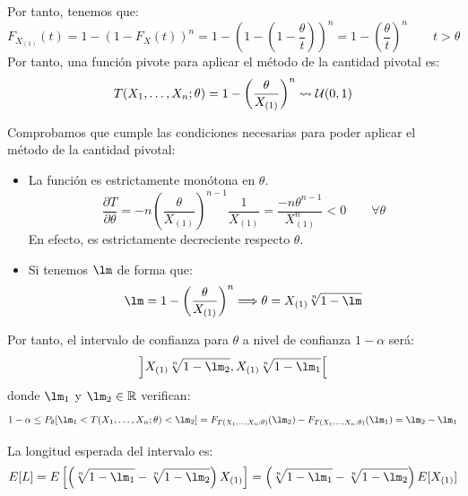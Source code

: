 \begin{ejercicio}
    Por tanto, tenemos que:
    \begin{equation*}
        F_{X_{(1)}}(t) = 1-{(1-F_X(t))}^{n} = 1 - {\left(1-\left(1-\frac{\theta}{t}\right)\right)}^{n} = 1-{\left(\frac{\theta}{t}\right)}^{n} \qquad t> \theta
    \end{equation*}
    Por tanto, una función pivote para aplicar el método de la cantidad pivotal es:
    \begin{equation*}
        T(X_1, \ldots, X_n;\theta) = 1-{\left(\frac{\theta}{X_{(1)}}\right)}^{n} \rightsquigarrow \mathcal{U}(0,1)
    \end{equation*}

    Comprobamos que cumple las condiciones necesarias para poder aplicar el método de la cantidad pivotal:
    \begin{itemize}
        \item La función es estrictamente monótona en $\theta$.
        \begin{equation*}
            \frac{\partial T}{\partial \theta} = -n{\left(\frac{\theta}{X_{(1)}}\right)}^{n-1}\frac{1}{X_{(1)}} = \frac{-n\theta^{n-1}}{X_{(1)}^n} < 0 \qquad \forall \theta
        \end{equation*}
        En efecto, es estrictamente decreciente respecto $\theta$.
        \item Si tenemos $\lm$ de forma que:
            \begin{equation*}
                \lm = 1-{\left(\frac{\theta}{X_{(1)}}\right)}^{n} \Longrightarrow \theta = X_{(1)}\sqrt[n]{1-\lm}
            \end{equation*}
    \end{itemize}

    Por tanto, el intervalo de confianza para $\theta$ a nivel de confianza $1-\alpha$ será:
    \begin{equation*}
        \left]X_{(1)}\sqrt[n]{1-\lm_2},X_{(1)}\sqrt[n]{1-\lm_1}\right[
    \end{equation*}
    donde $\lm_1$ y $\lm_2\in \bb{R}$ verifican:
    \begin{equation*}
        1-\alpha\leq P_\theta[\lm_1<T(X_1, \ldots, X_n;\theta)<\lm_2] = F_{T(X_1, \ldots, X_n;\theta)}(\lm_2) - F_{T(X_1, \ldots, X_n;\theta)}(\lm_1) = \lm_2-\lm_1
    \end{equation*}

    La longitud esperada del intervalo es:
    \begin{equation*}
        E[L] = E\left[\left(\sqrt[n]{1-\lm_1} - \sqrt[n]{1-\lm_2}\right) X_{(1)}\right] = \left(\sqrt[n]{1-\lm_1} - \sqrt[n]{1-\lm_2}\right)E[X_{(1)}]
    \end{equation*}


\end{ejercicio}
